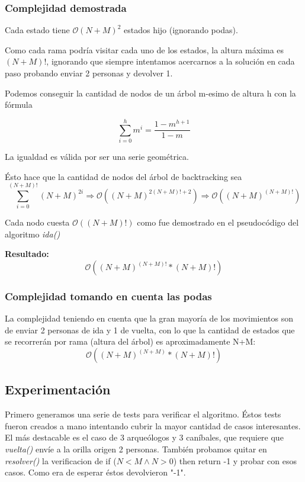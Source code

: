 \subsubsection{Complejidad demostrada}
Cada estado tiene $\mathcal{O}{(N+M)}^2$ estados hijo (ignorando podas).

Como cada rama podr\'ia visitar cada uno de los estados, la altura máxima es $(N+M)!$, ignorando que siempre intentamos acercarnos a la solución en cada paso probando enviar 2 personas y devolver 1.

Podemos conseguir la cantidad de nodos de un árbol m-esimo de altura h con la fórmula

\[
\sum_{i=0}^{h}{m}^{i} = \frac{1 - m^{h+1}}{1 - m}
\]

La igualdad es válida por ser una serie geométrica.

Ésto hace que la cantidad de nodos del árbol de backtracking sea
\[
\sum_{i=0}^{(N+M)!}{(N+M)}^{2i} \Rightarrow \mathcal{O}({(N+M)}^{2(N+M)! +2 })\Rightarrow \mathcal{O}({(N+M)}^{(N+M)!})
\]

Cada nodo cuesta $\mathcal{O}((N+M)!)$ como fue demostrado en el pseudocódigo del algoritmo \textit{ida()}

\vspace*{5mm}
\textbf{Resultado:}
\[
\mathcal{O}({(N+M)}^{(N+M)!} * (N+M)!)
\]


\subsubsection{Complejidad tomando en cuenta las podas}
La complejidad teniendo en cuenta que la gran mayoría de los movimientos son de enviar 2 personas de ida y 1 de vuelta, con lo que la cantidad de estados que se recorrerán por rama (altura del árbol) es aproximadamente N+M:
\[
\mathcal{O}({(N+M)}^{(N+M)} * (N+M)!)
\]

\subsection{Experimentación}

Primero generamos una serie de tests para verificar el algoritmo.
Éstos tests fueron creados a mano intentando cubrir la mayor cantidad de casos interesantes. El más destacable es el caso de 3 arqueólogos y 3 caníbales, que requiere que \textit{vuelta()} envíe a la orilla origen 2 personas.
También probamos quitar en \textit{resolver()} la verificacion de if ($N < M \land N > 0$) then return -1 y probar con esos casos. Como era de esperar éstos devolvieron "-1".

